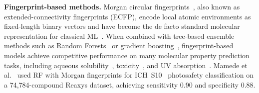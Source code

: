 \documentclass[journal=jcisd8,manuscript=article]{achemso}
\begin{document}
\textbf{Fingerprint-based methods.}
Morgan circular fingerprints~\cite{rogers2010extended}, also known as extended-connectivity fingerprints (ECFP), encode local atomic environments as fixed-length binary vectors and have become the de facto standard molecular representation for classical ML~\cite{wuMoleculeNet2018}.
When combined with tree-based ensemble methods such as Random Forests~\cite{breiman2001random} or gradient boosting~\cite{chen2016xgboost}, fingerprint-based models achieve competitive performance on many molecular property prediction tasks, including aqueous solubility~\cite{delaney2004esol, panapitiya2022evaluation}, toxicity~\cite{mayr2016deeptox}, and UV absorption~\cite{mamede2021machine}.
Mamede et al.~\cite{mamede2021machine} used RF with Morgan fingerprints for ICH~S10~\cite{ICH2013S10} photosafety classification on a 74,784-compound Reaxys dataset, achieving sensitivity 0.90 and specificity 0.88.
\end{document}
